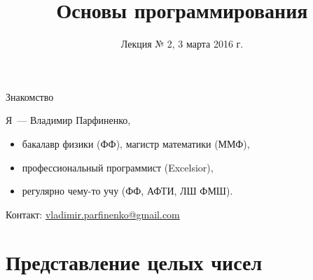 %




\newcommand{\reduceBlockEqSpacing}{%
  \vspace*{-\baselineskip}\setlength\belowdisplayshortskip{0pt}%
}

\usepackage{numprint}
\newcommand{\num}[1]{\numprint{#1}}
  \npthousandsep{\,}
  \npthousandthpartsep{}
  \npdecimalsign{,}

\newcommand{\pcnum}[1]{\ensuremath{\mathtt{#1}}}
\newcommand{\bin}[1]{\pcnum{#1}_2}
\newcommand{\hex}[1]{\pcnum{#1}_{16}}

\newcommand{\code}[1]{\texttt{#1}}

\title{Основы программирования}
\subtitle{Лекция № 2, 3 марта 2016 г.}
\date{}




\begin{frame}[plain]
  \titlepage
\end{frame}

\begin{frame}{Знакомство}

  Я~--- Владимир Парфиненко,

  \begin{itemize}
    \item бакалавр физики (ФФ), магистр математики (ММФ),
    \item профессиональный программист (Excelsior),
    \item регулярно чему-то учу (ФФ, АФТИ, ЛШ ФМШ).
  \end{itemize}

  Контакт:
  \href{mailto:vladimir.parfinenko@gmail.com}{vladimir.parfinenko@gmail.com}

\end{frame}

\section{Представление целых чисел}

